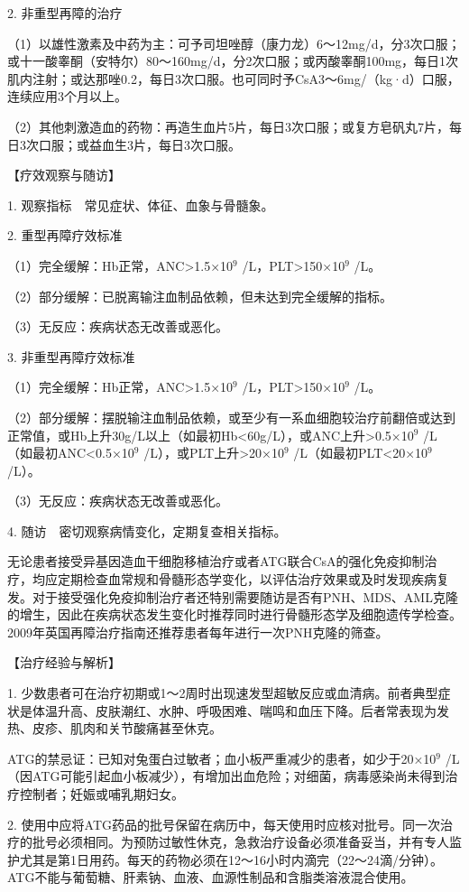 2. 非重型再障的治疗

（1）以雄性激素及中药为主：可予司坦唑醇（康力龙）6～12mg/d，分3次口服；或十一酸睾酮（安特尔）80～160mg/d，分2次口服；或丙酸睾酮100mg，每日1次肌内注射；或达那唑0.2，每日3次口服。也可同时予CsA3～6mg/（kg·d）口服，连续应用3个月以上。

（2）其他刺激造血的药物：再造生血片5片，每日3次口服；或复方皂矾丸7片，每日3次口服；或益血生3片，每日3次口服。

【疗效观察与随访】

1. 观察指标　常见症状、体征、血象与骨髓象。

2. 重型再障疗效标准

（1）完全缓解：Hb正常，ANC\textgreater{}1.5×10$^{9}$
/L，PLT\textgreater{}150×10$^{9}$ /L。

（2）部分缓解：已脱离输注血制品依赖，但未达到完全缓解的指标。

（3）无反应：疾病状态无改善或恶化。

3. 非重型再障疗效标准

（1）完全缓解：Hb正常，ANC\textgreater{}1.5×10$^{9}$
/L，PLT\textgreater{}150×10$^{9}$ /L。

（2）部分缓解：摆脱输注血制品依赖，或至少有一系血细胞较治疗前翻倍或达到正常值，或Hb上升30g/L以上（如最初Hb<60g/L），或ANC上升\textgreater{}0.5×10$^{9}$
/L（如最初ANC<0.5×10$^{9}$ /L），或PLT上升\textgreater{}20×10$^{9}$
/L（如最初PLT<20×10$^{9}$ /L）。

（3）无反应：疾病状态无改善或恶化。

4. 随访　密切观察病情变化，定期复查相关指标。

无论患者接受异基因造血干细胞移植治疗或者ATG联合CsA的强化免疫抑制治疗，均应定期检查血常规和骨髓形态学变化，以评估治疗效果或及时发现疾病复发。对于接受强化免疫抑制治疗者还特别需要随访是否有PNH、MDS、AML克隆的增生，因此在疾病状态发生变化时推荐同时进行骨髓形态学及细胞遗传学检查。2009年英国再障治疗指南还推荐患者每年进行一次PNH克隆的筛查。

【治疗经验与解析】

1.
少数患者可在治疗初期或1～2周时出现速发型超敏反应或血清病。前者典型症状是体温升高、皮肤潮红、水肿、呼吸困难、喘鸣和血压下降。后者常表现为发热、皮疹、肌肉和关节酸痛甚至休克。

ATG的禁忌证：已知对兔蛋白过敏者；血小板严重减少的患者，如少于20×10$^{9}$
/L（因ATG可能引起血小板减少），有增加出血危险；对细菌，病毒感染尚未得到治疗控制者；妊娠或哺乳期妇女。

2.
使用中应将ATG药品的批号保留在病历中，每天使用时应核对批号。同一次治疗的批号必须相同。为预防过敏性休克，急救治疗设备必须准备妥当，并有专人监护尤其是第1日用药。每天的药物必须在12～16小时内滴完（22～24滴/分钟）。ATG不能与葡萄糖、肝素钠、血液、血源性制品和含脂类溶液混合使用。

